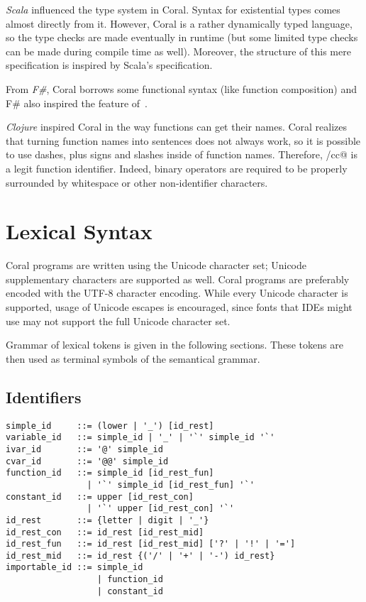 \emph{Scala} influenced the type system in Coral. Syntax for existential types comes almost directly from it. However, Coral is a rather dynamically typed language, so the type checks are made eventually in runtime (but some limited type checks can be made during compile time as well). Moreover, the structure of this mere specification is inspired by Scala's specification. 

From \emph{F\#}, Coral borrows some functional syntax (like function composition) and F\# also inspired the feature of~. 

\emph{Clojure} inspired Coral in the way functions can get their names. Coral realizes that turning function names into sentences does not always work, so it is possible to use dashes, plus signs and slashes inside of function names. Therefore, \lstinline@call/cc@ is a legit function identifier. Indeed, binary operators are required to be properly surrounded by whitespace or other non-identifier characters. 

\chapter{Lexical Syntax}

Coral programs are written using the Unicode character set; Unicode supplementary characters are supported as well. Coral programs are preferably encoded with the UTF-8 character encoding. While every Unicode character is supported, usage of Unicode escapes is encouraged, since fonts that IDEs might use may not support the full Unicode character set.

Grammar of lexical tokens is given in the following sections. These tokens are then used as terminal symbols of the semantical grammar. 

\newpage

\section{Identifiers}\label{sec:identifiers}

\syntax\begin{lstlisting}
simple_id     ::= (lower | '_') [id_rest]
variable_id   ::= simple_id | '_' | '`' simple_id '`'
ivar_id       ::= '@' simple_id
cvar_id       ::= '@@' simple_id
function_id   ::= simple_id [id_rest_fun]
                | '`' simple_id [id_rest_fun] '`'
constant_id   ::= upper [id_rest_con]
                | '`' upper [id_rest_con] '`'
id_rest       ::= {letter | digit | '_'}
id_rest_con   ::= id_rest [id_rest_mid]
id_rest_fun   ::= id_rest [id_rest_mid] ['?' | '!' | '=']
id_rest_mid   ::= id_rest {('/' | '+' | '-') id_rest}
importable_id ::= simple_id
                  | function_id
                  | constant_id
\end{lstlisting}

